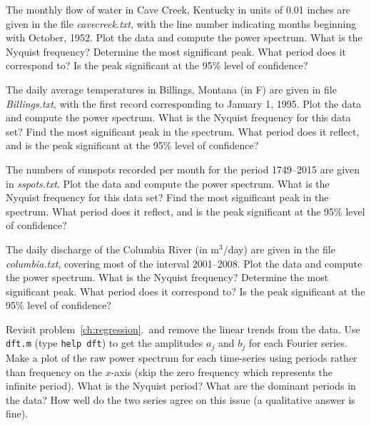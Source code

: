 \begin{problem}
	The monthly flow of water in Cave Creek, Kentucky in units of 0.01 inches are given in the file \emph{cavecreek.txt},
	with the line number indicating months beginning with October, 1952.  Plot the data and compute the
	power spectrum.  What is the Nyquist frequency? Determine the most significant peak.  What period does it correspond to? Is the peak significant
	at the 95\% level of confidence?
\end{problem}

\begin{problem}
	The daily average temperatures in Billings, Montana (in \DS F) are given in file \emph{Billings.txt},
	with the first record corresponding to January 1, 1995.  Plot the data and compute the
	power spectrum.  What is the Nyquist frequency for this data set? Find the most significant peak in the spectrum.
	What period does it reflect, and is the peak significant at the 95\% level of confidence?
\end{problem}

\begin{problem}
	The numbers of sunspots recorded per month for the period 1749--2015 are given in \emph{sspots.txt}.
	Plot the data and compute the power spectrum.  What is the Nyquist frequency for this data set? Find the most significant peak in the spectrum.
	What period does it reflect, and is the peak significant at the 95\% level of confidence?
\end{problem}

\begin{problem}
	The daily discharge of the Columbia River (in m$^3$/day) are given in the file \emph{columbia.txt}, covering
	most of the interval 2001--2008. Plot the data and compute the
	power spectrum.  What is the Nyquist frequency? Determine the most significant peak.  What period does it correspond to? Is the peak significant
	at the 95\% level of confidence?
\end{problem}
	
\begin{problem}
	Revisit problem~\ref{ch:regression}.\theEDA\ and 
	remove the linear trends from the data.  Use \texttt{dft.m} (type \texttt{help dft}) to get the amplitudes $a_j$ and $b_j$ for 
	each Fourier series.  Make a plot of the raw power spectrum for each time-series using periods rather 
	than frequency on the $x$-axis (skip the zero frequency which represents the infinite period).  What is the 
	Nyquist period?
	What are the dominant periods in the data?  How well do the two series agree on this issue (a 
	qualitative answer is fine).
\end{problem}

